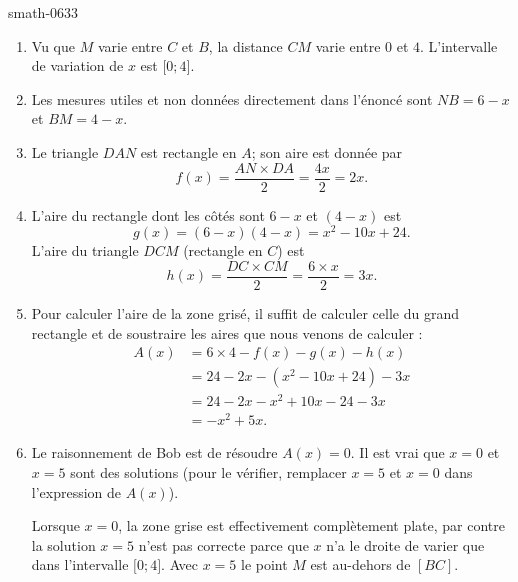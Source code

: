 
\begin{corrige}{smath-0633}

    \begin{enumerate}
        \item
            Vu que \( M\) varie entre \( C\) et \( B\), la distance \( CM\) varie entre \( 0\) et \( 4\). L'intervalle de variation de \( x\) est \( \mathopen[ 0 ; 4 \mathclose]\).
        \item
            Les mesures utiles et non données directement dans l'énoncé sont \( NB=6-x\) et \( BM=4-x\).
        \item
            Le triangle \( DAN\) est rectangle en \( A\); son aire est donnée par
            \begin{equation}
                f(x)=\frac{ AN\times DA }{ 2 }=\frac{ 4x }{ 2 }=2x.
            \end{equation}
        \item
            L'aire du rectangle dont les côtés sont \( 6-x\) et \( (4-x)\) est
            \begin{equation}
                g(x)=(6-x)(4-x)=x^2-10x+24.
            \end{equation}
            L'aire du triangle \( DCM\) (rectangle en \( C\)) est
            \begin{equation}
                h(x)=\frac{ DC\times CM}{ 2 }=\frac{ 6\times x }{2}=3x.
            \end{equation}
        \item
            Pour calculer l'aire de la zone grisé, il suffit de calculer celle du grand rectangle et de soustraire les aires que nous venons de calculer :
            \begin{subequations}
                \begin{align}
                A(x)&=6\times 4-f(x)-g(x)-h(x)\\
                &=24-2x-(x^2-10x+24)-3x\\
                &=24-2x-x^2+10x-24-3x\\
                &=-x^2+5x.
                \end{align}
            \end{subequations}
        \item
            Le raisonnement de Bob est de résoudre \( A(x)=0\). Il est vrai que \( x=0\) et \( x=5\) sont des solutions (pour le vérifier, remplacer \( x=5\) et \( x=0\) dans l'expression de \( A(x)\)).

            Lorsque \( x=0\), la zone grise est effectivement complètement plate, par contre la solution \( x=5\) n'est pas correcte parce que \( x\) n'a le droite de varier que dans l'intervalle \( \mathopen[ 0; 4 \mathclose]\). Avec \( x=5\) le point \( M\) est au-dehors de \( [BC]\).

    \end{enumerate}

\end{corrige}

